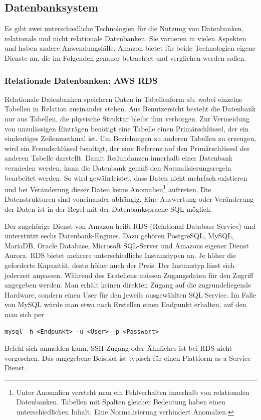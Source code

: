 \subsection{Datenbanksystem}
Es gibt zwei unterschiedliche Technologien für die Nutzung von Datenbanken, relationale und nicht relationale Datenbanken.
Sie variieren in vielen Aspekten und haben andere Anwendungsfälle.
Amazon bietet für beide Technologien eigene Dienste an, die im Folgenden genauer betrachtet und verglichen werden sollen.

\subsubsection{Relationale Datenbanken: AWS RDS}

Relationale Datenbanken speichern Daten in Tabellenform ab, wobei einzelne Tabellen in Relation zueinander stehen.
Aus Benutzersicht besteht die Datenbank nur aus Tabellen, die physische Struktur bleibt ihm verborgen.
Zur Vermeidung von unzulässigen Einträgen benötigt eine Tabelle einen Primärschlüssel, der ein eindeutiges Zeilenmerkmal ist.
Um Beziehungen zu anderen Tabellen zu erzeugen, wird ein Fremdschlüssel benötigt, der eine Referenz auf den Primärschlüssel der anderen Tabelle darstellt.
Damit Redundanzen innerhalb einer Datenbank vermieden werden, kann die Datenbank gemäß den Normalisierungsregeln bearbeitet werden.
So wird gewährleistet, dass Daten nicht mehrfach existieren und bei Veränderung dieser Daten keine Anomalien\footnote{Unter Anomalien versteht man ein Fehlverhalten innerhalb von relationalen Datenbanken. Tabellen
mit Spalten gleicher Bedeutung haben einen unterschiedlichen Inhalt. Eine Normalisierung verhindert Anomalien. } auftreten.
Die Datenstrukturen sind voneinander abhängig. Eine Auswertung oder Veränderung der Daten ist in der Regel mit der Datenbanksprache SQL möglich. \cite[]{Datenbankvergleich}

Der zugehörige Dienst von Amazon heißt RDS (Relational Database Service) und unterstützt sechs Datenbank-Engines. Dazu gehören
PostgreSQL, MySQL, MariaDB, Oracle Database, Microsoft SQL-Server und Amazons eigener Dienst Aurora.
RDS bietet mehrere unterschiedliche Instanztypen an.
Je höher die geforderte Kapazität, desto höher auch der Preis.
Der Instanztyp lässt sich jederzeit anpassen.
Während des Erstellens müssen Zugangsdaten für den Zugriff angegeben werden.
Man erhält keinen direkten Zugang auf die zugrundeliegende Hardware, sondern einen User für den jeweils ausgewählten SQL Service.
Im Falle von MySQL würde man etwa nach Erstellen einen Endpunkt erhalten, auf den man sich per
\begin{lstlisting}[basicstyle=\ttfamily\small, breaklines=true , frame = single, backgroundcolor=\color{flashwhite} ]
  mysql -h <Endpunkt> -u <User> -p <Passwort>
    \end{lstlisting} Befehl sich anmelden kann. SSH-Zugang oder Ähnliches ist bei RDS nicht vorgesehen.
    Das angegebene Beispiel ist typisch für einen Plattform as a Service Dienst.

